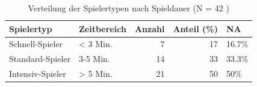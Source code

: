 \begin{table}[htbp]
\centering
\caption{Verteilung der Spielertypen nach Spieldauer (N = 42 )} 
\label{tab:spielertypen}
\begin{tabular}{llrrl}
  \toprule
Spielertyp & Zeitbereich & Anzahl & Anteil (\%) & NA \\ 
  \midrule
Schnell-Spieler & < 3 Min. & 7 & 17 & 16.7\% \\ 
  Standard-Spieler & 3-5 Min. & 14 & 33 & 33.3\% \\ 
  Intensiv-Spieler & > 5 Min. & 21 & 50 & 50\% \\ 
   \bottomrule
\end{tabular}
\end{table}